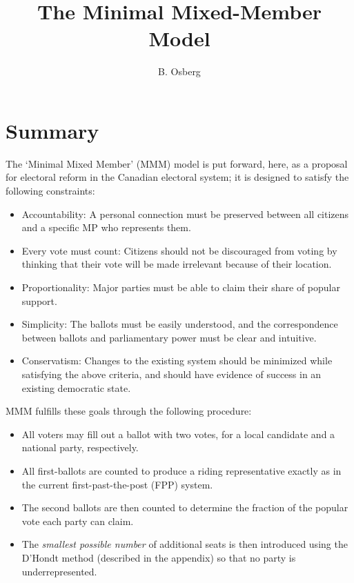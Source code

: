 \documentclass[DIV=calc, paper=a4, fontsize=11pt, twocolumn]{scrartcl}	 %
\title{The Minimal Mixed-Member Model} %
\author{B. Osberg} %
\date{} %
\begin{document}
\thispagestyle{fancy} %

\section*{Summary}
The `Minimal Mixed Member' (MMM) model is put forward, here, as a proposal for electoral reform in the Canadian electoral system; it is designed to satisfy the following constraints:

\begin{itemize}
\item Accountability: A personal connection must be preserved between all citizens and a specific MP who represents them.  
\item Every vote must count: Citizens should not be discouraged from voting by thinking that their vote will be made irrelevant because of their location. 
\item Proportionality: Major parties must be able to claim their share of popular support. 
\item  Simplicity: The ballots must be easily understood, and the correspondence between ballots and parliamentary power must be clear and intuitive.
\item  Conservatism: Changes to the existing system should be minimized while satisfying the above criteria, and should have evidence of success in an existing democratic state.
\end{itemize}

MMM fulfills these goals through the following procedure:

\begin{itemize}
\item All voters may fill out a ballot with two votes, for a local candidate and a national party, respectively.
\item All first-ballots are counted to produce a riding representative exactly as in the current first-past-the-post (FPP) system.
\item The second ballots are then counted to determine the fraction of the popular vote each party can claim.
\item The \emph{smallest possible number} of additional seats is then introduced using the D'Hondt method (described in the appendix) so that no party is underrepresented.
\end{itemize}
\end{document}
